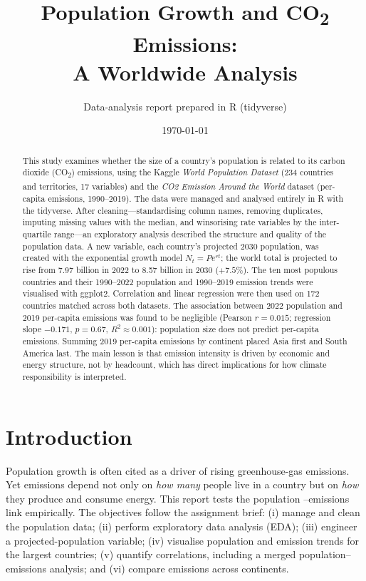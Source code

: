 \documentclass[11pt]{article}
\title{\vspace{-1.2cm}\textbf{Population Growth and CO\textsubscript{2} Emissions:\\ A Worldwide Analysis}}
\author{Data-analysis report prepared in R (tidyverse)}
\date{\today}
\begin{document}
\maketitle

\begin{abstract}
\noindent
This study examines whether the size of a country's population is related to its
carbon dioxide (CO\textsubscript{2}) emissions, using the Kaggle \emph{World
Population Dataset} (234 countries and territories, 17 variables) and the
\emph{CO2 Emission Around the World} dataset (per-capita emissions, 1990--2019).
The data were managed and analysed entirely in R with the tidyverse. After
cleaning---standardising column names, removing duplicates, imputing missing
values with the median, and winsorising rate variables by the inter-quartile
range---an exploratory analysis described the structure and quality of the
population data. A new variable, each country's projected 2030 population, was
created with the exponential growth model $N_t = P e^{rt}$; the world total is
projected to rise from 7.97 billion in 2022 to 8.57 billion in 2030
($+7.5\%$). The ten most populous countries and their 1990--2022 population and
1990--2019 emission trends were visualised with ggplot2. Correlation and linear
regression were then used on 172 countries matched across both datasets. The
association between 2022 population and 2019 per-capita emissions was found to be
negligible (Pearson $r = 0.015$; regression slope $-0.171$, $p = 0.67$,
$R^2 \approx 0.001$): population size does not predict per-capita emissions.
Summing 2019 per-capita emissions by continent placed Asia first and South
America last. The main lesson is that emission intensity is driven by economic
and energy structure, not by headcount, which has direct implications for how
climate responsibility is interpreted.
\end{abstract}

\section{Introduction}
Population growth is often cited as a driver of rising greenhouse-gas emissions.
Yet emissions depend not only on \emph{how many} people live in a country but on
\emph{how} they produce and consume energy. This report tests the population
--emissions link empirically. The objectives follow the assignment brief:
(i) manage and clean the population data; (ii) perform exploratory data analysis
(EDA); (iii) engineer a projected-population variable; (iv) visualise population
and emission trends for the largest countries; (v) quantify correlations,
including a merged population--emissions analysis; and (vi) compare emissions
across continents.
\end{document}
